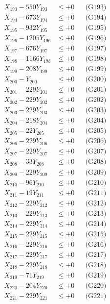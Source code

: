 \documentclass[a4paper,10pt]{article}
\begin{document}
{\begin{align}
X_{193} - 550Y_{193} &\leq +0 && \text{(G193)} \\
X_{194} - 673Y_{194} &\leq +0 && \text{(G194)} \\
X_{195} - 932Y_{195} &\leq +0 && \text{(G195)} \\
X_{196} - 1205Y_{196} &\leq +0 && \text{(G196)} \\
X_{197} - 676Y_{197} &\leq +0 && \text{(G197)} \\
X_{198} - 1166Y_{198} &\leq +0 && \text{(G198)} \\
X_{199} - 208Y_{199} &\leq +0 && \text{(G199)} \\
X_{200} - Y_{200} &\leq +0 && \text{(G200)} \\
\allowbreak
X_{201} - 229Y_{201} &\leq +0 && \text{(G201)} \\
X_{202} - 229Y_{202} &\leq +0 && \text{(G202)} \\
X_{203} - 229Y_{203} &\leq +0 && \text{(G203)} \\
X_{204} - 218Y_{204} &\leq +0 && \text{(G204)} \\
X_{205} - 22Y_{205} &\leq +0 && \text{(G205)} \\
X_{206} - 229Y_{206} &\leq +0 && \text{(G206)} \\
X_{207} - 229Y_{207} &\leq +0 && \text{(G207)} \\
X_{208} - 33Y_{208} &\leq +0 && \text{(G208)} \\
X_{209} - 229Y_{209} &\leq +0 && \text{(G209)} \\
X_{210} - 96Y_{210} &\leq +0 && \text{(G210)} \\
\allowbreak
X_{211} - 19Y_{211} &\leq +0 && \text{(G211)} \\
X_{212} - 229Y_{212} &\leq +0 && \text{(G212)} \\
X_{213} - 229Y_{213} &\leq +0 && \text{(G213)} \\
X_{214} - 229Y_{214} &\leq +0 && \text{(G214)} \\
X_{215} - 229Y_{215} &\leq +0 && \text{(G215)} \\
X_{216} - 229Y_{216} &\leq +0 && \text{(G216)} \\
X_{217} - 229Y_{217} &\leq +0 && \text{(G217)} \\
X_{218} - 229Y_{218} &\leq +0 && \text{(G218)} \\
X_{219} - 71Y_{219} &\leq +0 && \text{(G219)} \\
X_{220} - 204Y_{220} &\leq +0 && \text{(G220)} \\
\allowbreak
X_{221} - 229Y_{221} &\leq +0 && \text{(G221)} \\

\end{align}}
\end{document}
